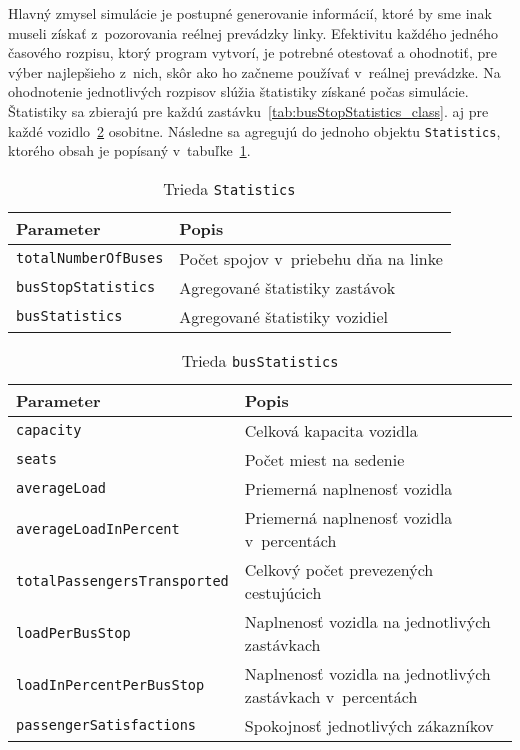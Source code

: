 Hlavný zmysel simulácie je postupné generovanie informácií, ktoré by sme inak museli získať z~pozorovania reélnej prevádzky linky.
Efektivitu každého jedného časového rozpisu, ktorý program vytvorí, je potrebné otestovať a ohodnotiť, pre výber najlepšieho z~nich, skôr ako ho začneme používať v~reálnej prevádzke.
Na ohodnotenie jednotlivých rozpisov slúžia štatistiky získané počas simulácie.
Štatistiky sa zbierajú pre každú zastávku~\ref{tab:busStopStatistics_class}. aj pre každé vozidlo~\ref{tab:busStatistics_class} osobitne.
Následne sa agregujú do jednoho objektu \texttt{Statistics}, ktorého obsah je popísaný v~tabuľke~\ref{tab:statistics_class}.
\begin{table}[h]\label{tab:statistics_class}
  \centering
  \begin{tabularx}{\textwidth}{|l|X|}
    \hline
    \textbf{Parameter} & \textbf{Popis} \\ \hline
    \texttt{totalNumberOfBuses} & Počet spojov v~priebehu dňa na linke \\ \hline
    \texttt{busStopStatistics} & Agregované štatistiky zastávok \\ \hline
    \texttt{busStatistics} & Agregované štatistiky vozidiel \\ \hline
  \end{tabularx}
  \caption{Trieda \texttt{Statistics}}
\end{table}

\begin{table}[h]\label{tab:busStatistics_class}
  \centering
  \begin{tabularx}{\textwidth}{|l|X|}
    \hline
    \textbf{Parameter} & \textbf{Popis} \\ \hline
    \texttt{capacity} & Celková kapacita vozidla \\ \hline
    \texttt{seats} & Počet miest na sedenie \\ \hline
    \texttt{averageLoad} & Priemerná naplnenosť vozidla \\ \hline
    \texttt{averageLoadInPercent} & Priemerná naplnenosť vozidla v~percentách \\ \hline
    \texttt{totalPassengersTransported} & Celkový počet prevezených cestujúcich \\ \hline
    \texttt{loadPerBusStop} & Naplnenosť vozidla na jednotlivých zastávkach \\ \hline
    \texttt{loadInPercentPerBusStop} & Naplnenosť vozidla na jednotlivých zastávkach v~percentách \\ \hline
    \texttt{passengerSatisfactions} & Spokojnosť jednotlivých zákazníkov \\ \hline
  \end{tabularx}
  \caption{Trieda \texttt{busStatistics}}
\end{table}

